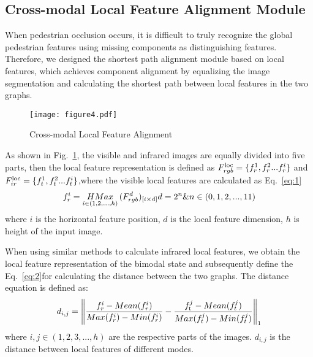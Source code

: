 \documentclass[journal]{IEEEtran}
\begin{document}
\subsection{Cross-modal Local Feature Alignment Module}
When pedestrian occlusion occurs, it is difficult to truly recognize the global pedestrian features using missing components as distinguishing features. Therefore, we designed the shortest path alignment module based on local features, which achieves component alignment by equalizing the image segmentation and calculating the shortest path between local features in the two graphs.
\vspace{-0.8cm}
\begin{figure}[ht]
\centering
\texttt{[image: figure4.pdf]}
\vspace{-.05in}
\caption{Cross-modal Local Feature Alignment}
\label{fig4}
\end{figure}

As shown in Fig.~\ref{fig4}, the visible and infrared images are equally divided into five parts, then the local feature representation is defined as $F_{rgb}^{{\rm{loc}}} = \{ f_r^1,f_r^2...f_r^i\}$ and $F_{ir}^{{\rm{loc}}} = \{ f_t^1,f_t^2...f_t^i\}$,where the visible local features are calculated as Eq.~\ref{eq:1}
	\begin{equation}
	\small
	\label{eq:1}
	f_r^i = \mathop {HMax}\limits_{i \in (1,2,...,h)} {(F_{rgb}^d)_{{\rm{[}}i \times {\rm{d]}}}}{\rm{    }}d = {2^n}\& n \in (0,1,2,...,11)
	\end{equation}
	where $i$ is the horizontal feature position, $d$ is the local feature dimension, $h$ is height of the input image.
	
	When using similar methods to calculate infrared local features, we obtain the local feature representation of the bimodal state and subsequently define the Eq.~\ref{eq:2}for calculating the distance between the two graphs. The distance equation is defined as:
	\begin{equation}
		\small
		\label{eq:2}
		{d_{i,j}} = {\left\| {\frac{{f_r^i - Mean(f_r^i)}}{{Max(f_r^i) - Min(f_r^i)}} - \frac{{f_{\rm{t}}^j - Mean(f_t^j)}}{{Max(f_t^j) - Min(f_t^j)}}} \right\|_1}
	\end{equation}
	where $i,j\in (1,2,3,...,h)$ are the respective parts of the images. ${d_{i,j}}$ is the distance between local features of different modes. 
	
\end{document}
